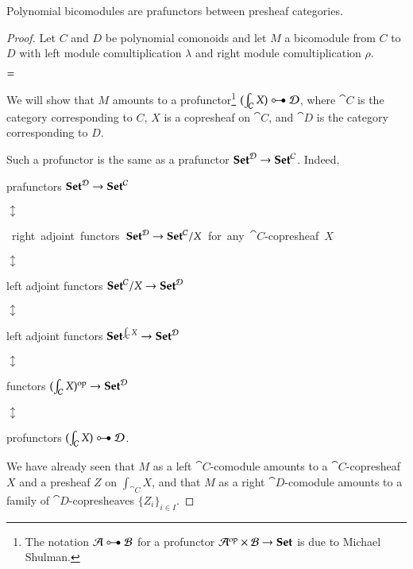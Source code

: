 \documentclass{amsart}
\begin{document}
\begin{prop}
  Polynomial bicomodules are prafunctors between presheaf categories.
\end{prop}
\begin{proof}
  Let $C$ and $D$ be polynomial comonoids and let $M$ a bicomodule from
  $C$ to $D$ with left module comultiplication $\lambda$ and right
  module comultiplication $\rho$.
  \begin{center}
    
    \quad
    $=$
    \quad
    
  \end{center}

  We will show that $M$ amounts to a profunctor\footnote{The notation
    $\cat{A} \prof \cat{B}$ for a profunctor
    $\mathcal{A}^{\mathrm{op}} \times \mathcal{B} \to {\normalfont\mathbf{Set}}$ is due to Michael Shulman.}
  $(\int_{\cat{C}} X) \prof \cat{D}$, where $\cat{C}$ is the category
  corresponding to $C$, $X$ is a copresheaf on $\cat{C}$, and
  $\cat{D}$ is the category corresponding to $D$.

  Such a profunctor is the same as a prafunctor
  ${\normalfont\mathbf{Set}}^{\mathcal{D}} \to {\normalfont\mathbf{Set}}^{\mathcal{C}}$. Indeed,
  \begin{center}
    prafunctors ${\normalfont\mathbf{Set}}^{\mathcal{D}} \to {\normalfont\mathbf{Set}}^{\mathcal{C}}$
    
    $\updownarrow$
    
    \vspace{-.2em}\mbox{ right
      adjoint functors ${\normalfont\mathbf{Set}}^{\mathcal{D}} \to {\normalfont\mathbf{Set}}^{\mathcal{C}}/X$
      {\footnotesize for any $\cat{C}$-copresheaf $X$}}
    
    $\updownarrow$
    
    \vspace{-.2em}left adjoint functors ${\normalfont\mathbf{Set}}^{\mathcal{C}}/X \to {\normalfont\mathbf{Set}}^{\mathcal{D}}$
    
    $\updownarrow$
    
    \vspace{-.6em}left adjoint functors ${\normalfont\mathbf{Set}}^{\int_{\mathcal{C}}X} \to {\normalfont\mathbf{Set}}^{\mathcal{D}}$

    $\updownarrow$
    
    functors $(\int_{\mathcal{C}}X)^{\mathrm{op}} \to {\normalfont\mathbf{Set}}^{\mathcal{D}}$

    $\updownarrow$

    profunctors $(\int_{\cat{C}} X) \prof \cat{D}$.
  \end{center}

  We have already seen that $M$ as a left $\cat{C}$-comodule amounts to a
  $\cat{C}$-copresheaf $X$ and a presheaf $Z$ on $\int_{\cat{C}}X$,
  and that $M$ as a right $\cat{D}$-comodule amounts to a family of
  $\cat{D}$-copresheaves $\{Z_i\}_{i \in I}$.


\end{proof}
\end{document}
